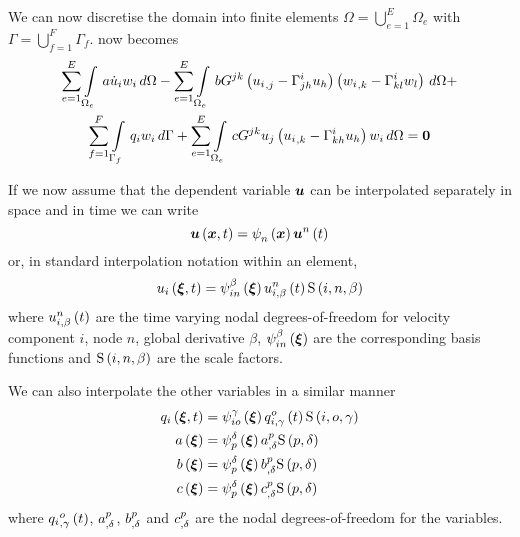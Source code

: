 
We can now discretise the domain into finite elements \ie $\Omega=
\displaystyle{\bigcup_{e=1}^{E}}\Omega_{e}$ with
$\Gamma=\displaystyle{\bigcup_{f=1}^{F}}\Gamma_{f}$. 
now becomes
\begin{multline}
  \dsum_{e=1}^{E}\gint{\Omega_{e}}{}{a\dot{u}_{i}w_{i}}{\Omega}-
  \dsum_{e=1}^{E}\gint{\Omega_{e}}{}{bG^{jk}\pbrac{\partialderiv{u_{i}}{j}-
      \christoffel{i}{j}{h}u_{h}} \pbrac{\partialderiv{w_{i}}{k}-
      \christoffel{i}{k}{l}w_{l}}}{\Omega}+ \\
  \dsum_{f=1}^{F}\gint{\Gamma_{f}}{}{q_{i}w_{i}}{\Gamma} +
  \dsum_{e=1}^{E}\gint{\Omega_{e}}{}{cG^{jk}u_{j}\pbrac{\partialderiv{u_{i}}{k}-
      \christoffel{i}{k}{h}u_{h}}w_{i}}{\Omega}=\vect{0}
  \label{eqn:Burgersfemform}
\end{multline}

If we now assume that the dependent variable $\vect{u}$ can be interpolated
separately in space and in time we can write
\begin{equation}
  \fnof{\vect{u}}{\vect{x},t}=\gbfn{n}{}{\vect{x}}\fnof{\nodept{\vect{u}}{n}}{t}
\end{equation}
or, in standard interpolation notation within an element,
\begin{equation}
  \fnof{u_{i}}{\vect{\xi},t}=\idxgbfn{i}{n}{\beta}{\vect{\xi}}
  \fnof{\idxnodedof{u}{i}{n}{\beta}}{t}\idxgsf{i}{n}{\beta}
\end{equation}
where $\fnof{\idxnodedof{u}{i}{n}{\beta}}{t}$ are the time varying nodal
degrees-of-freedom for velocity component $i$, node $n$, global derivative $\beta$,
$\idxgbfn{i}{n}{\beta}{\vect{\xi}}$ are the corresponding basis functions 
and $\idxgsf{i}{n}{\beta}$ are the scale factors. 

We can also interpolate the other variables in a similar manner \ie
\begin{equation}
  \begin{split}
    \fnof{q_{i}}{\vect{\xi},t} &= \idxgbfn{i}{o}{\gamma}{\vect{\xi}}
    \fnof{\idxnodedof{q}{i}{o}{\gamma}}{t}\idxgsf{i}{o}{\gamma} \\
    \fnof{a}{\vect{\xi}} &=\gbfn{p}{\delta}{\vect{\xi}}
    \nodedof{a}{p}{\delta}\gsf{p}{\delta} \\
    \fnof{b}{\vect{\xi}} &=\gbfn{p}{\delta}{\vect{\xi}}\nodedof{b}{p}{\delta}
    \gsf{p}{\delta} \\
    \fnof{c}{\vect{\xi}}
    &=\gbfn{p}{\delta}{\vect{\xi}}\nodedof{c}{p}{\delta}\gsf{p}{\delta}
  \end{split}
\end{equation}
where $\fnof{\nodedof{q_{i}}{o}{\gamma}}{t}$, $\nodedof{a}{p}{\delta}$,
$\nodedof{b}{p}{\delta}$ and $\nodedof{c}{p}{\delta}$ are the
nodal degrees-of-freedom for the variables.


